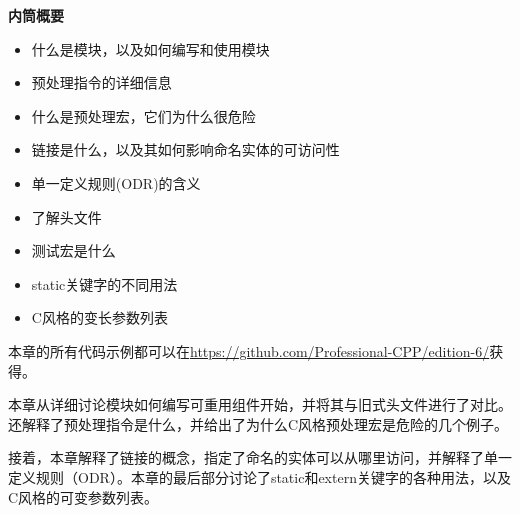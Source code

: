 \noindent
\textbf{内筒概要}

\begin{itemize}
\item
什么是模块，以及如何编写和使用模块

\item
预处理指令的详细信息

\item
什么是预处理宏，它们为什么很危险

\item
链接是什么，以及其如何影响命名实体的可访问性

\item
单一定义规则(ODR)的含义

\item
了解头文件

\item
测试宏是什么

\item
static关键字的不同用法

\item
C风格的变长参数列表
\end{itemize}

本章的所有代码示例都可以在\url{https://github.com/Professional-CPP/edition-6/}获得。

本章从详细讨论模块如何编写可重用组件开始，并将其与旧式头文件进行了对比。还解释了预处理指令是什么，并给出了为什么C风格预处理宏是危险的几个例子。

接着，本章解释了链接的概念，指定了命名的实体可以从哪里访问，并解释了单一定义规则（ODR）。本章的最后部分讨论了static和extern关键字的各种用法，以及C风格的可变参数列表。































